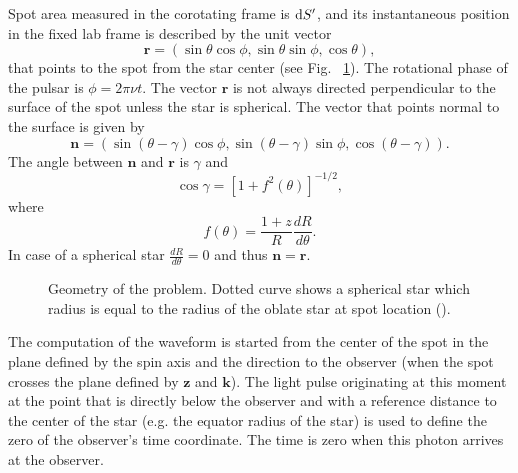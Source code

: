\documentclass{wihuri}
\def\be{\begin{equation}}
\def\ee{\end{equation}}
\def\d{{\rm d}}
\newcommand{\bmath}[1]{\boldsymbol{#1}}
\begin{document}
Spot area measured in the corotating frame is $\d S^\prime$, and its instantaneous position in
the fixed lab frame is described by the unit vector 
\begin{equation}
\bmath{r}=(\sin\theta\cos\phi, \sin\theta\sin\phi, \cos\theta),
\end{equation}
that points to the spot from the star center (see Fig. ~\ref{fig:geom2}). The rotational phase of the pulsar is $\phi=2\pi\nu t$. The vector $\bmath{r}$ is not always directed perpendicular to the surface of the spot unless the star is spherical. The vector that points normal to the surface is given by
\begin{equation}
\bmath{n}=(\sin(\theta-\gamma)\cos\phi, \sin(\theta-\gamma)\sin\phi, \cos(\theta-\gamma)).
\end{equation}
The angle between $\bmath{n}$ and $\bmath{r}$ is $\gamma$ and 
\begin{equation}
\cos\gamma=[1+f^{2}(\theta)]^{-1/2},
\end{equation}
where
\be \label{eq:ftheta}
f(\theta)=\frac{1+z}{R}\frac{dR}{d\theta}.
\ee
In case of a spherical star $\frac{dR}{d\theta} = 0$ and thus $\bmath{n} = \bmath{r}$.

\begin{figure}
\centerline{}
\caption{Geometry of the problem. Dotted curve shows a spherical star which radius is equal to the radius of the oblate star at spot location (\cite{morsink}).%
\label{fig:geom2}}
\end{figure}



The computation of the waveform is started from the center of the spot in the plane defined by the spin axis and the direction to the observer 
(when the spot crosses the plane defined by $\bmath{z}$ and $\bmath{k}$). The light pulse originating at this moment at the point that is directly below the observer and with a reference distance to the center of the star (e.g. the equator radius of the star) is used to define the zero of the observer's time coordinate. The time is zero when this photon arrives at the observer. 
\end{document}
